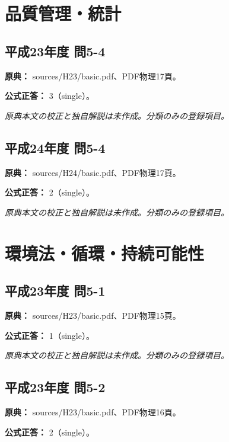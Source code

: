 \section{品質管理・統計}

\subsection{平成23年度 問5-4}
\label{q:h23-reg-basic-5-4}

\noindent\textbf{原典：} sources/H23/basic.pdf、PDF物理17頁。

\textbf{公式正答：} 3（single）。

\par\textit{原典本文の校正と独自解説は未作成。分類のみの登録項目。}

\subsection{平成24年度 問5-4}
\label{q:h24-reg-basic-5-4}

\noindent\textbf{原典：} sources/H24/basic.pdf、PDF物理17頁。

\textbf{公式正答：} 2（single）。

\par\textit{原典本文の校正と独自解説は未作成。分類のみの登録項目。}

\section{環境法・循環・持続可能性}

\subsection{平成23年度 問5-1}
\label{q:h23-reg-basic-5-1}

\noindent\textbf{原典：} sources/H23/basic.pdf、PDF物理15頁。

\textbf{公式正答：} 1（single）。

\par\textit{原典本文の校正と独自解説は未作成。分類のみの登録項目。}

\subsection{平成23年度 問5-2}
\label{q:h23-reg-basic-5-2}

\noindent\textbf{原典：} sources/H23/basic.pdf、PDF物理16頁。

\textbf{公式正答：} 2（single）。

